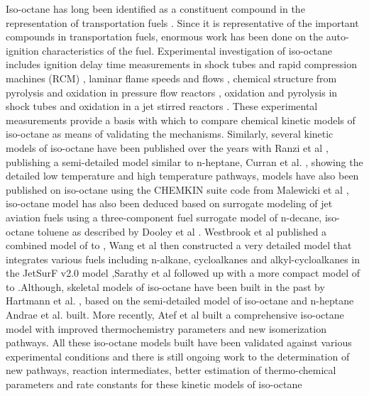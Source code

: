 Iso-octane has long been identified as a constituent compound in the representation of transportation fuels \cite{Dooley2010AProperties}. Since it is representative of the important compounds in transportation fuels, enormous work has been done on the auto-ignition characteristics of the fuel. Experimental investigation of iso-octane includes ignition delay time measurements in shock tubes and rapid compression machines (RCM)  \cite{Fieweger1994Shock-tubePressures}\cite{Fieweger1997Self-ignitionPressure}\cite{Malewicki2013ExperimentalIso-octane}
\cite{Gauthier2004ShockMixtures}\cite{Hartmann2011Auto-ignitionModeling}, laminar flame speeds and flows \cite{BRADLEY1998126}\cite{KUMAR2007209}\cite{Li2012LaminarMixtures}\cite{Hui2013LaminarPressures}\cite{Bieleveld2009ExperimentalFlows}, chemical structure from pyrolysis and oxidation in pressure flow reactors \cite{Gokulakrishnan2007ExperimentalConditions}\cite{Jahangirian2012APressures}, oxidation and pyrolysis in shock tubes \cite{Malewicki2013ExperimentalIso-octane}\cite{Tekawade2016Time-resolvedN-dodecane} and oxidation in a jet stirred reactors \cite{Dagaut2015TheStudy}\cite{Dagaut2014CombustionModeling}\cite{Dagaut2008OxidationStudy}. These experimental measurements provide a basis with which to compare chemical kinetic models of iso-octane as means of validating the mechanisms. Similarly, several kinetic models of iso-octane have been published over the years with Ranzi et al \cite{Ranzi1997AOxidation}, publishing a semi-detailed model similar to n-heptane, Curran et al. \cite{Curran2002AOxidation}, showing the detailed low temperature and high temperature pathways, models have also been published on iso-octane using the CHEMKIN suite code from Malewicki et al \cite{Malewicki2013ExperimentalIso-octane}, iso-octane model has also been deduced based on surrogate modeling of jet aviation fuels using a three-component fuel surrogate model of n-decane, iso-octane toluene as described by Dooley et al \cite{Dooley2010MethylModel}. Westbrook et al \cite{Westbrook2009AN-hexadecane} published a combined model of  to , Wang et al then constructed a very detailed model that integrates various fuels including n-alkane, cycloalkanes and alkyl-cycloalkanes in the JetSurF v2.0 model \cite{Wang2010A2.0},Sarathy et al followed up with a more compact model of  to  \cite{Sarathy2011ComprehensiveC20}.Although, skeletal models of iso-octane have been built in the past by Hartmann et al. \cite{Hartmann2011Auto-ignitionModeling}, based on the semi-detailed model of iso-octane and n-heptane Andrae et al. \cite{ANDRAE2008696} built. More recently, Atef et al \cite{Atef2017AKinetics} built a comprehensive iso-octane model with improved thermochemistry parameters and new isomerization pathways. All these iso-octane models built have been validated against various experimental conditions and there is still ongoing work to the determination of new pathways, reaction intermediates, better estimation of thermo-chemical parameters and rate constants for these kinetic models of iso-octane
